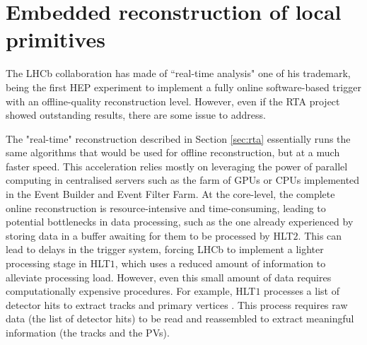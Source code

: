
\chapter{Embedded reconstruction of local primitives}
\label{chp:retina}

The LHCb collaboration has made of ``real-time analysis" one of his trademark, being the first HEP experiment to implement a fully online software-based trigger with an offline-quality reconstruction level. However, even if the RTA project showed outstanding results, there are some issue to address. 

The "real-time" reconstruction described in Section \ref{sec:rta} essentially runs the same algorithms that would be used for offline reconstruction, but at a much faster speed. This acceleration relies mostly on leveraging the power of parallel computing in centralised servers such as the farm of GPUs or CPUs implemented in the Event Builder and Event Filter Farm.
At the core-level, the complete online reconstruction is resource-intensive and time-consuming, leading to potential bottlenecks in data processing, such as the one already experienced by storing data in a buffer awaiting for them to be processed by HLT$2$. This can lead to delays in the trigger system, forcing LHCb to implement a lighter processing stage in HLT$1$, which uses a reduced amount of information to alleviate processing load.
However, even this small amount of data requires computationally expensive procedures. For example, HLT$1$ processes a list of detector hits to extract tracks and primary vertices \cite{https://doi.org/10.5281/zenodo.8119731}. This process requires raw data (the list of detector hits) to be read and reassembled to extract meaningful information (the tracks and the PVs).

